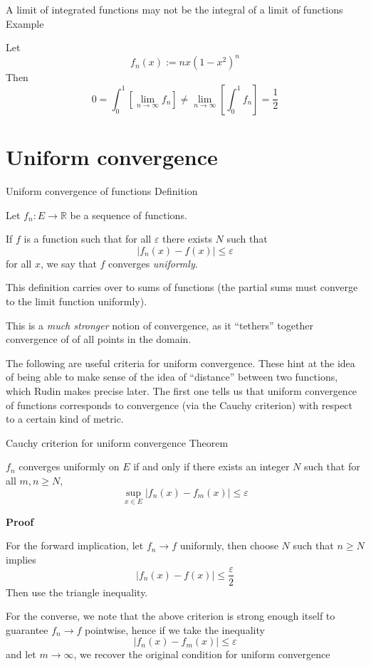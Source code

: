 \begin{result}
    {A limit of integrated functions may not be the integral of a limit of functions}
    {Example}

    Let 
    \[f_n(x) := n x(1-x^2)^n\]
    Then
    \[0 = \int_0^1 \left[\lim_{n \to \infty} f_n \right] \neq \lim_{n \to \infty} \left[\int_0^1 f_n \right] = \frac{1}{2} \]
\end{result}

\section{Uniform convergence}

\begin{result}
    {Uniform convergence of functions}
    {Definition}

    Let $f_n: E \rightarrow \mathbb{R}$ be a sequence of functions. 

    If $f$ is a function such that for all $\varepsilon$ there exists $N$ such that
    \[|f_n(x) - f(x)| \leq \varepsilon\]
    for all $x$, we say that $f$ converges \textit{uniformly}.
\end{result}

    This definition carries over to sums of functions (the partial sums must converge to the limit function uniformly).

This is a \textit{much stronger} notion of convergence, as it ``tethers'' together convergence of of all points in the domain. 

The following are useful criteria for uniform convergence. These hint at the idea of being able to make sense of the idea of ``distance'' between two functions, which Rudin makes precise later. The first one tells us that uniform convergence of functions corresponds to convergence (via the Cauchy criterion) with respect to a certain kind of metric. 

\begin{result}
    {Cauchy criterion for uniform convergence}
    {Theorem}

    $f_n$ converges uniformly on $E$ if and only if there exists an integer $N$ such that for all $m, n \geq N$,
    \[\sup_{x \in E}|f_n(x) - f_m(x)| \leq \varepsilon\]

    \textbf{Proof}

    For the forward implication, let $f_n \rightarrow f$ uniformly, then choose $N$ such that $n \geq N$ implies 
    \[|f_n(x) - f(x)| \leq \frac{\varepsilon}{2}\]
    Then use the triangle inequality.

    For the converse, we note that the above criterion is strong enough itself to guarantee $f_n \rightarrow f$ pointwise, hence if we take the inequality
    \[|f_n(x) - f_m(x)| \leq \varepsilon\]
    and let $m \rightarrow \infty$, we recover the original condition for uniform convergence
\end{result}

